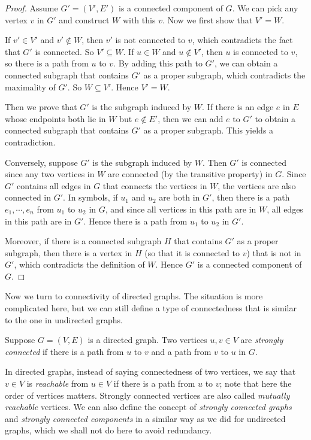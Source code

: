 \begin{proof}
    Assume $G'=(V', E')$ is a connected component of $G$. We can pick any vertex $v$ in $G'$ and construct $W$ with this $v$. Now we first show that $V'=W$. 

    If $v'\in V'$ and $v'\not\in W$, then $v'$ is not connected to $v$, which contradicts the fact that $G'$ is connected. So $V'\subseteq W$. If $u\in W$ and $u\not\in V'$, then $u$ is connected to $v$, so there is a path from $u$ to $v$. By adding this path to $G'$, we can obtain a connected subgraph that contains $G'$ as a proper subgraph, which contradicts the maximality of $G'$. So $W\subseteq V'$. Hence $V'=W$.

    Then we prove that $G'$ is the subgraph induced by $W$. If there is an edge $e$ in $E$ whose endpoints both lie in $W$ but $e\not\in E'$, then we can add $e$ to $G'$ to obtain a connected subgraph that contains $G'$ as a proper subgraph. This yields a contradiction. 

    Conversely, suppose $G'$ is the subgraph induced by $W$. Then $G'$ is connected since any two vertices in $W$ are connected (by the transitive property) in $G$. Since $G'$ contains all edges in $G$ that connects the vertices in $W$, the vertices are also connected in $G'$. In symbols, if $u_1$ and $u_2$ are both in $G'$, then there is a path $e_1,\cdots,e_n$ from $u_1$ to $u_2$ in $G$, and since all vertices in this path are in $W$, all edges in this path are in $G'$. Hence there is a path from $u_1$ to $u_2$ in $G'$.

    Moreover, if there is a connected subgraph $H$ that contains $G'$ as a proper subgraph, then there is a vertex in $H$ (so that it is connected to $v$) that is not in $G'$, which contradicts the definition of $W$. Hence $G'$ is a connected component of $G$.
\end{proof}

Now we turn to connectivity of directed graphs. The situation is more complicated here, but we can still define a type of connectedness that is similar to the one in undirected graphs.

\begin{definition}
    Suppose $G=(V,E)$ is a directed graph. Two vertices $u,v\in V$ are \emph{strongly connected} if there is a path from $u$ to $v$ and a path from $v$ to $u$ in $G$.
\end{definition}

In directed graphs, instead of saying connectedness of two vertices, we say that $v\in V$ is \emph{reachable} from $u\in V$ if there is a path from $u$ to $v$; note that here the order of vertices matters. Strongly connected vertices are also called \emph{mutually reachable} vertices. We can also define the concept of \emph{strongly connected graphs} and \emph{strongly connected components} in a similar way as we did for undirected graphs, which we shall not do here to avoid redundancy.

